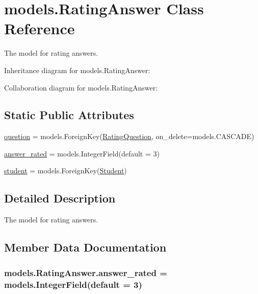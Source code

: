 \hypertarget{classmodels_1_1_rating_answer}{}\section{models.\+Rating\+Answer Class Reference}
\label{classmodels_1_1_rating_answer}


The model for rating answers.  




Inheritance diagram for models.\+Rating\+Answer\+:


Collaboration diagram for models.\+Rating\+Answer\+:
\subsection*{Static Public Attributes}
\begin{DoxyCompactItemize}
\item 
\hyperlink{classmodels_1_1_rating_answer_a8a0ec04798b69f11a6e6373dd1f42513}{question} = models.\+Foreign\+Key(\hyperlink{classmodels_1_1_rating_question}{Rating\+Question}, on\+\_\+delete=models.\+C\+A\+S\+C\+A\+DE)
\item 
\hyperlink{classmodels_1_1_rating_answer_a9949b415369fd2576005136c760fd56b}{answer\+\_\+rated} = models.\+Integer\+Field(default = 3)
\item 
\hyperlink{classmodels_1_1_rating_answer_a23088d51ac44aad2ca654cfe0876240d}{student} = models.\+Foreign\+Key(\hyperlink{classmodels_1_1_student}{Student})
\end{DoxyCompactItemize}


\subsection{Detailed Description}
The model for rating answers. 

\subsection{Member Data Documentation}
\subsubsection[{\texorpdfstring{answer\+\_\+rated}{answer_rated}}]{\setlength{\rightskip}{0pt plus 5cm}models.\+Rating\+Answer.\+answer\+\_\+rated = models.\+Integer\+Field(default = 3)\hspace{0.3cm}{\ttfamily [static]}}\hypertarget{classmodels_1_1_rating_answer_a9949b415369fd2576005136c760fd56b}{}\label{classmodels_1_1_rating_answer_a9949b415369fd2576005136c760fd56b}
